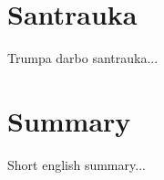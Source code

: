 \documentclass[a4paper,12pt]{article}
\begin{document}
 
\section*{Santrauka}
Trumpa darbo santrauka...
\section*{Summary}
Short english summary... 
\end{document}
